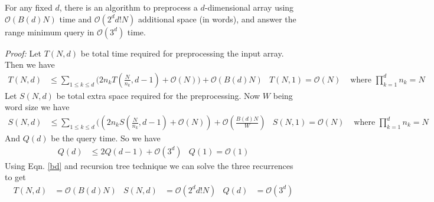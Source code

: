 \begin{theorem}
For any fixed $d$, there is an algorithm to preprocess a $d$-dimensional array using $\mathcal{O}(B(d)N)$ time and $\mathcal{O}(2^dd!N)$ additional space (in words), and answer the range minimum query in $\mathcal{O}(3^d)$ time.
\end{theorem}
\emph{Proof:} Let $T(N,d)$ be total time  required for preprocessing the input array. Then we have
\begin{align}
T(N,d)&\leq \sum\limits_{1\leq k\leq d}\big(2n_kT(\frac{N}{n_k},d-1)+\mathcal{O}(N))+\mathcal{O}(B(d)N)\nonumber & T(N,1)=\mathcal{O}(N)\nonumber &\text{ where } \prod\limits_{k=1}^dn_k = N
\end{align}
Let $S(N,d)$ be total extra space required for the preprocessing. Now $W$ being word size we have
\begin{align}
S(N,d)&\leq \sum\limits_{1\leq k\leq d}\big((2n_kS(\frac{N}{n_k},d-1)+\mathcal{O}(N))+\mathcal{O}(\frac{B(d)N}{W})\nonumber & S(N,1)= \mathcal{O}(N)\nonumber &\text{ where } \prod\limits_{k=1}^dn_k = N
\end{align}
And $Q(d)$ be the query time. So we have
\begin{align}
Q(d)&\leq 2Q(d-1) + \mathcal{O}(3^d) & Q(1)=\mathcal{O}(1)\nonumber
\end{align}
Using Eqn. \eqref{bd} and recursion tree technique we can solve the three recurrences to get
\begin{align}
T(N,d)&=\mathcal{O}(B(d)N) & S(N,d)&=\mathcal{O}(2^dd!N) & Q(d)&=\mathcal{O}(3^d)\nonumber
\end{align}
